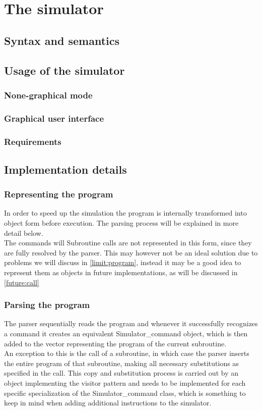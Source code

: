 \chapter{The simulator}
\label{chap:simulator}
\section{Syntax and semantics}
\section{Usage of the simulator}
\subsection{None-graphical mode}
\subsection{Graphical user interface}
\subsection{Requirements}
\section{Implementation details}
\subsection{Representing the program}
In order to speed up the simulation the program is internally transformed into object form before execution. The parsing process will be explained in more detail below.\\
The commands will 
Subroutine calls are not represented in this form, since they are fully resolved by the parser. This may however not be an ideal solution due to problems we will discuss in \autoref{limit:program}, instead it may be a good idea to represent them as objects in future implementations, as will be discussed in \autoref{future:call}

\subsection{Parsing the program}
The parser sequentially reads the program and whenever it successfully recognizes a command it creates an equivalent Simulator\_command object, which is then added to the vector representing the program of the current subroutine.\\
An exception to this is the call of a subroutine, in which case the parser inserts the entire program of that subroutine, making all necessary substitutions as specified in the call. This copy and substitution process is carried out by an object implementing the visitor pattern and needs to be implemented for each specific specialization of the Simulator\_command class, which is something to keep in mind when adding additional instructions to the simulator.

